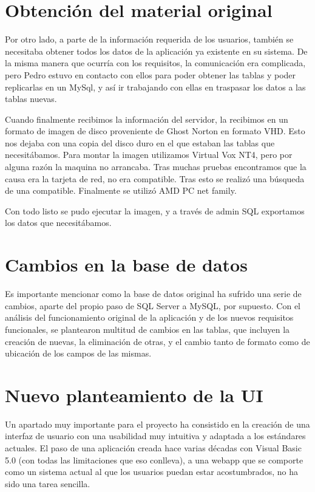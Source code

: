 \section{Obtención del material original}

Por otro lado, a parte de la información requerida de los usuarios, también se necesitaba obtener todos los datos de la aplicación ya existente en su sistema. De la misma manera que ocurría con los requisitos, la comunicación era complicada, pero Pedro estuvo en contacto con ellos para poder obtener las tablas y poder replicarlas en un MySql, y así ir trabajando con ellas en traspasar los datos a las tablas nuevas.

Cuando finalmente recibimos la información del servidor, la recibimos en un formato de imagen de disco proveniente de Ghost Norton en formato VHD. Esto nos dejaba con una copia del disco duro en el que estaban las tablas que necesitábamos.
Para montar la imagen utilizamos Virtual Vox NT4, pero por alguna razón la maquina no arrancaba. Tras muchas pruebas encontramos que la causa era la tarjeta de red, no era compatible. Tras esto se realizó una búsqueda de una compatible. Finalmente se utilizó AMD PC net family. 

Con todo listo se pudo ejecutar la imagen, y a través de admin SQL exportamos los datos que necesitábamos.

\section{Cambios en la base de datos}

Es importante mencionar como la base de datos original ha sufrido una serie de cambios,  aparte del propio paso de SQL Server a MySQL, por supuesto. Con el análisis del funcionamiento original de la aplicación y de los nuevos requisitos funcionales, se plantearon multitud de cambios en las tablas, que incluyen la creación de nuevas, la eliminación de otras, y el cambio tanto de formato como de ubicación de los campos de las mismas.

\section{Nuevo planteamiento de la UI}

Un apartado muy importante para el proyecto ha consistido en la creación de una interfaz de usuario con una usabilidad muy intuitiva y adaptada a los estándares actuales. El paso de una aplicación creada hace varias décadas con Visual Basic 5.0 (con todas las limitaciones que eso conlleva), a una webapp que se comporte como un sistema actual al que los usuarios puedan estar acostumbrados, no ha sido una tarea sencilla. 

